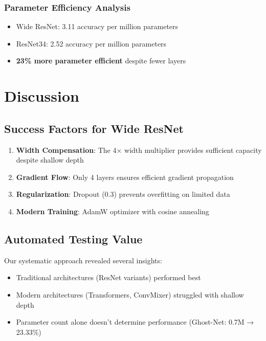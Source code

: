 \documentclass[11pt,a4paper]{article}
\begin{document}
\subsubsection{Parameter Efficiency Analysis}
\begin{itemize}
    \item Wide ResNet: 3.11 accuracy per million parameters
    \item ResNet34: 2.52 accuracy per million parameters
    \item \textbf{23\% more parameter efficient} despite fewer layers
\end{itemize}

\section{Discussion}

\subsection{Success Factors for Wide ResNet}

\begin{enumerate}
    \item \textbf{Width Compensation}: The 4× width multiplier provides sufficient capacity despite shallow depth
    \item \textbf{Gradient Flow}: Only 4 layers ensures efficient gradient propagation
    \item \textbf{Regularization}: Dropout (0.3) prevents overfitting on limited data
    \item \textbf{Modern Training}: AdamW optimizer with cosine annealing
\end{enumerate}

\subsection{Automated Testing Value}

Our systematic approach revealed several insights:
\begin{itemize}
    \item Traditional architectures (ResNet variants) performed best
    \item Modern architectures (Transformers, ConvMixer) struggled with shallow depth
    \item Parameter count alone doesn't determine performance (Ghost-Net: 0.7M → 23.33\%)
\end{itemize}
\end{document}
